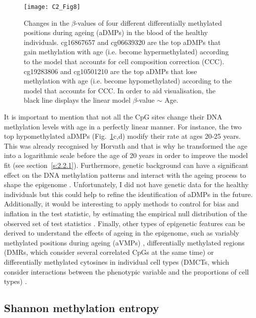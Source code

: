 \begin{figure}[htbp!] 
	\centering    
	\texttt{[image: C2\_Fig8]}
	\caption[Changes in the $\beta$-values of four different aDMPs]{Changes in the $\beta$-values of four different differentially methylated positions during ageing (aDMPs) in the blood of the healthy individuals. cg16867657 and cg06639320 are the top aDMPs that gain methylation with age (i.e. become hypermethylated) according to the model that accounts for cell composition correction (CCC). cg19283806 and cg10501210 are the top aDMPs that lose methylation with age (i.e. become hypomethylated) according to the model that accounts for CCC. In order to aid visualisation, the black line displays the linear model $\beta$-value $\sim$ Age.}
	\label{fig:c2_fig8}
\end{figure}

\bigskip

It is important to mention that not all the CpG sites change their DNA methylation levels with age in a perfectly linear manner. For instance, the two top hypomethylated aDMPs (Fig.~\ref{fig:c2_fig8}c,d) modify their rate at ages 20-25 years. This was already recognised by Horvath \cite{Horvath2013} and that is why he transformed the age into a logarithmic scale before the age of 20 years in order to improve the model fit (see section~\ref{s:2.2.1}). Furthermore, genetic background can have a significant effect on the DNA methylation patterns and interact with the ageing process to shape the epigenome \cite{Hannum2013,VanDongen2016}. Unfortunately, I did not have genetic data for the healthy individuals but this could help to refine the identification of aDMPs in the future. Additionally, it would be interesting to apply methods to control for bias and inflation in the test statistic, by estimating the empirical null distribution of the observed set of test statistics \cite{VanIterson2017}. Finally, other types of epigenetic features can be derived to understand the effects of ageing in the epigenome, such as variably methylated positions during ageing (\acrshort{aVMPs}) \cite{Slieker2016}, differentially methylated regions (\acrshort{DMRs}, which consider several correlated CpGs at the same time) \cite{Teschendorff2018} or differentially methylated cytosines in individual cell types (\acrshort{DMCTs}, which consider interactions between the phenotypic variable and the proportions of cell types) \cite{Zheng2018}.


\smallskip

\subsection{Shannon methylation entropy} \label{s:2.1.5}

